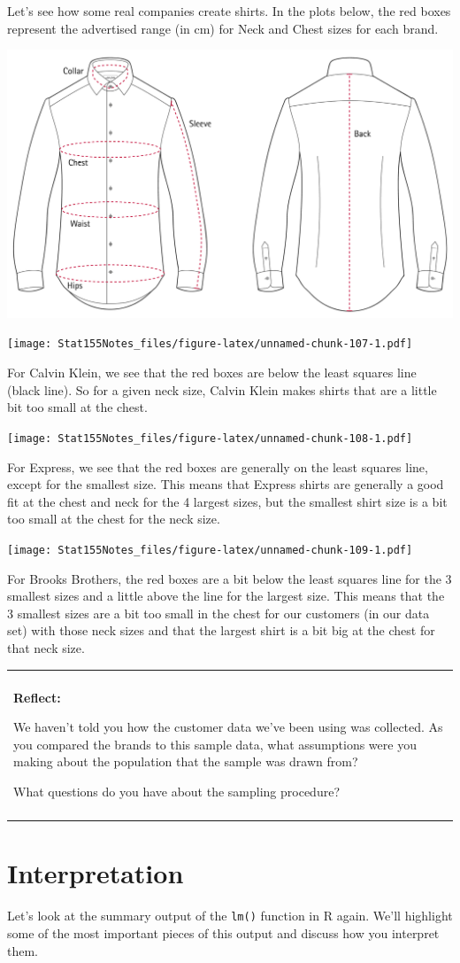 \documentclass[]{book}
\newenvironment{reflect}
{
    \begin{center}
    
    \begin{tabular}{|p{0.8\textwidth}|}
    \rowcolor{LightBlue}
    \hline\\
    \rowcolor{LightBlue}
    \textbf{Reflect:}
}
{
    \\\rowcolor{LightBlue}
    \\\hline
    \end{tabular} 
    \end{center}
}
\begin{document}
Let's see how some real companies create shirts. In the plots below, the red boxes represent the advertised range (in cm) for Neck and Chest sizes for each brand.

\includegraphics[width=.25\textwidth]{Photos/shirtchart}

\texttt{[image: Stat155Notes\_files/figure-latex/unnamed-chunk-107-1.pdf]}

For Calvin Klein, we see that the red boxes are below the least squares line (black line). So for a given neck size, Calvin Klein makes shirts that are a little bit too small at the chest.

\texttt{[image: Stat155Notes\_files/figure-latex/unnamed-chunk-108-1.pdf]}

For Express, we see that the red boxes are generally on the least squares line, except for the smallest size. This means that Express shirts are generally a good fit at the chest and neck for the 4 largest sizes, but the smallest shirt size is a bit too small at the chest for the neck size.

\texttt{[image: Stat155Notes\_files/figure-latex/unnamed-chunk-109-1.pdf]}

For Brooks Brothers, the red boxes are a bit below the least squares line for the 3 smallest sizes and a little above the line for the largest size. This means that the 3 smallest sizes are a bit too small in the chest for our customers (in our data set) with those neck sizes and that the largest shirt is a bit big at the chest for that neck size.

\begin{reflect}
We haven't told you how the customer data we've been using was
collected. As you compared the brands to this sample data, what
assumptions were you making about the population that the sample was
drawn from?

What questions do you have about the sampling procedure?
\end{reflect}

\hypertarget{interpretation}{%
\section{Interpretation}\label{interpretation}}

Let's look at the summary output of the \texttt{lm()} function in R again. We'll highlight some of the most important pieces of this output and discuss how you interpret them.
\end{document}
